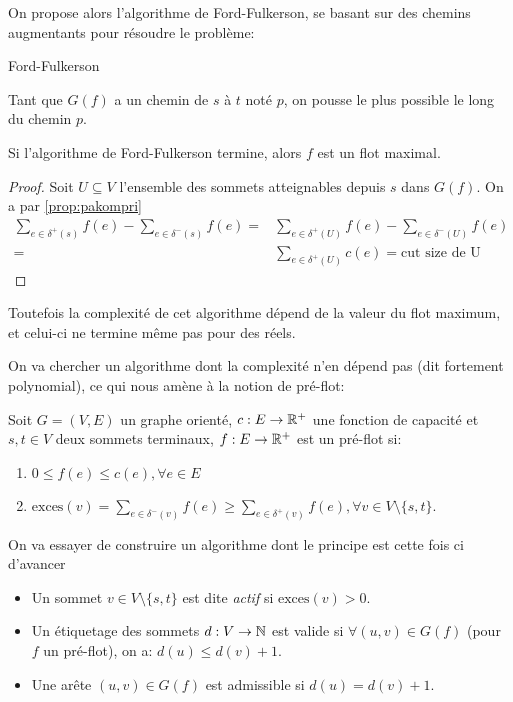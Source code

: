 \documentclass[math, info]{cours}
\begin{document}
On propose alors l'algorithme de Ford-Fulkerson, se basant sur des chemins augmentants pour résoudre le problème:
\begin{algorithm}
	\caption{Ford-Fulkerson}
	\label{alg:fordfulkerson}
	Tant que $G(f)$ a un chemin de $s$ à $t$ noté $p$, on pousse le plus possible le long du chemin $p$.
\end{algorithm}

\begin{thm}
	Si l'algorithme de Ford-Fulkerson termine, alors $f$ est un flot maximal.
\end{thm}

\begin{proof}
	Soit $U \subseteq V$ l'ensemble des sommets atteignables depuis $s$ dans $G(f)$. On a par \ref{prop:pakompri}
	\begin{equation*}
		\begin{aligned}
			\sum_{e \in \delta^{+}(s)} f(e) - \sum_{e\in \delta^{-}(s)}f(e) = & \sum_{e \in \delta^{+}(U)}f(e) - \sum_{e \in \delta^{-}(U)}f(e) \\
			=                                                                 & \sum_{e\in \delta^{+}(U)} c(e) = \text{cut size de U}
		\end{aligned}
	\end{equation*}
\end{proof}
Toutefois la complexité de cet algorithme dépend de la valeur du flot maximum, et celui-ci ne termine même pas pour des réels.

On va chercher un algorithme dont la complexité n'en dépend pas (dit fortement polynomial), ce qui nous amène à la notion de pré-flot:
\begin{definition}
	Soit $G = \left(V, E\right)$ un graphe orienté, $c: E \to \mathbb{R}^{+}$ une fonction de capacité et $s, t \in V$ deux sommets terminaux,
	$f: E\to \mathbb{R}^{+}$ est un pré-flot si:
	\begin{enumerate}
		\item $0 \leq f(e) \leq c(e), \forall e \in E$
		\item $\mathrm{exces}(v) = \sum_{e \in \delta^{-}(v)} f(e) \geq \sum_{e \in \delta^{+}(v)} f(e), \forall v \in V \setminus \{s, t\}$.
	\end{enumerate}
	\label{def:preflot}
\end{definition}

On va essayer de construire un algorithme dont le principe est cette fois ci d'avancer
\begin{definition}
	\begin{itemize}
		\item Un sommet $v \in V\setminus \{s, t\}$ est dite \emph{actif} si $\mathrm{exces}(v) > 0$.
		\item Un étiquetage des sommets $d: V \to \mathbb{N}$ est valide si $\forall (u, v) \in G(f)$ (pour $f$ un pré-flot), on a: $d(u) \leq d(v) + 1$.
		\item Une arête $(u, v) \in G(f)$ est admissible si $d(u) = d(v) + 1$.
	\end{itemize}
	\label{def:activenode}
\end{definition}
\end{document}
